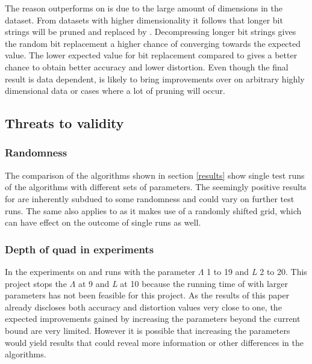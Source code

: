 The reason \qsr{} outperforms \qs{} on \mnist{} is due to the large amount of dimensions in the \mnist{} dataset. From datasets with higher dimensionality it follows that longer bit strings will be pruned and replaced by \qs{}. Decompressing longer bit strings gives the random bit replacement a higher chance of converging towards the expected value. The lower expected value for \qsr{} bit replacement compared to \qs{} gives \qsr{} a better chance to obtain better accuracy and lower distortion. Even though the final result is data dependent, \qsr{} is likely to bring improvements over \qs{} on arbitrary highly dimensional data or cases where a lot of pruning will occur.

\subsection{Threats to validity}

\subsubsection{Randomness}
\label{disc/threats/randomness}
The comparison of the algorithms shown in section \ref{results} show single test runs of the algorithms with different sets of parameters. The seemingly positive results for \qsr{} are inherently subdued to some randomness and could vary on further test runs. The same also applies to \qs{} as it makes use of a randomly shifted grid, which can have effect on the outcome of single runs as well.

\subsubsection{Depth of quad in experiments}
\label{disc/threats/depth}
In \cite{wagner17} the experiments on \qs{} and \grid{} runs with the parameter $\Lambda$ 1 to 19 and \textit{L} 2 to 20. This project stops the $\Lambda$ at 9 and \textit{L} at 10 because the running time of \qs{} with larger parameters has not been feasible for this project. As the results of this paper already discloses both accuracy and distortion values very close to one, the expected improvements gained by increasing the parameters beyond the current bound are very limited. However it is possible that increasing the parameters would yield results that could reveal more information or other differences in the algorithms.

